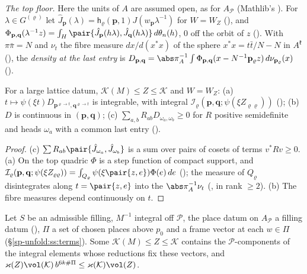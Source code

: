 \emph{The top floor.} Here the units of $A$ are assumed open, as for $A_{\mathcal P}$
(Mathlib's ). For $\lambda\in G^{(\varrho)}$ let $\hat J_{\mathbf p}(\lambda)=\mathsf h_\varrho(\mathbf p,1)J(w_{\mathbf p}\lambda^{-1})$ for
$W=W_Z$ (), and $\Phi_{\mathbf p,\mathbf q}(\lambda^{-1}z)=\int_H\pair{\hat J_{\mathbf p}(h\lambda),\hat J_{\mathbf q}(h\lambda)}\,d\theta_n(h)$,
$0$ off the orbit of $z$ (). With $\pi\bar\pi=N$ and $\nu_t$
the fibre measure $dx/d(x^*x)$ of the sphere $x^*x=t\bar t/N-N$ in $A^{\mathfrak k}$
(), the \emph{density at the last entry} is
$D_{\mathbf p,\mathbf q}=\abs\pi_A^{-1}\int\Phi_{\mathbf p,\mathbf q}(x-N^{-1}\mathbf p_\varrho z)\,d\nu_{\mathbf p_\varrho}(x)$
().

\begin{proposition}\label{sp-frames:prop:top}
For a large lattice datum, $\mathcal K(M)\le Z\le\mathcal K$ and $W=W_Z$: (a) $t\mapsto\psi(\xi t)
D_{\mathbf p^{\varrho\to t},\mathbf q^{\varrho\to t}}$ is integrable, with integral $\mathcal I_\varrho(\mathbf p,\mathbf q;
\psi(\xi Z_{\varrho\varrho}))$ ();
(b) $D$ is continuous in $(\mathbf p,\mathbf q)$; (c) $\sum_{a,b}R_{ab}D_{\omega_a,\omega_b}\ge0$ for $R$ positive
semidefinite and heads $\omega_a$ with a common last entry
().
\end{proposition}

\begin{proof}
(c) $\sum R_{ab}\pair{\hat J_{\omega_a},\hat J_{\omega_b}}$ is a sum over pairs of cosets of terms
$v^*Rv\ge0$. (a) On the top quadric $\Phi$ is a step function of compact support, and
$\mathcal I_\varrho(\mathbf p,\mathbf q;\psi(\xi Z_{\varrho\varrho}))=\int_{Q_\varrho}\psi(\xi\pair{z,e})\Phi(e)\,de$
(); the
measure of $Q_\varrho$ disintegrates along $t=\pair{z,e}$ into the $\abs\pi_A^{-1}\nu_t$
(, in rank $\ge2$). (b) The fibre
measures depend continuously on $t$.
\end{proof}

\begin{theorem}
\label{sp-frames:thm:fixed}
Let $S$ be an admissible filling, $M^{-1}$ integral off $\mathcal P$, the place datum on $A_{\mathcal P}$ a
filling datum (), $\Pi$ a set of chosen places above $p_0$ and a frame
vector at each $w\in\Pi$ (\S\ref{sp-unfold:ss:terms}). Some $\mathcal K(M)\le Z\le\mathcal K$
contains the $\mathcal P$-components of the integral elements whose reductions fix these vectors, and
$\varkappa(Z)\vol(\mathcal K)\,b^{6k\#\Pi}\le\varkappa(\mathcal K)\vol(Z)$.
\end{theorem}

